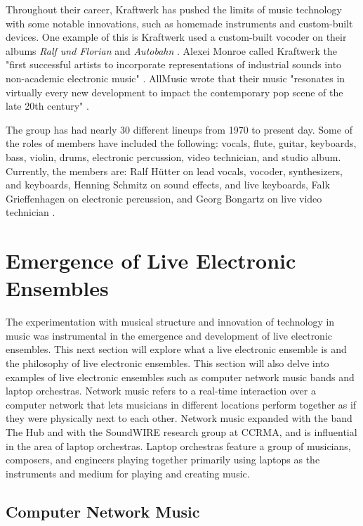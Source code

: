\documentclass[letterpaper, 12pt]{article}
\begin{document}
%
Throughout their career, Kraftwerk has pushed the limits of music technology with some notable innovations, such as homemade instruments and custom-built devices.
%
One example of this is Kraftwerk used a custom-built vocoder on their albums \textit{Ralf und Florian} and \textit{Autobahn} \citep{moogulator2006vocoder}.
%
Alexei Monroe called Kraftwerk the "first successful artists to incorporate representations of industrial sounds into non-academic electronic music" \citep{monroe2005interrogation}.
%
AllMusic wrote that their music "resonates in virtually every new development to impact the contemporary pop scene of the late 20th century" \citep{allmusic2009kraftwerk}.

%
The group has had nearly 30 different lineups from 1970 to present day. Some of the roles of members have included the following: vocals, flute, guitar, keyboards, bass, violin, drums, electronic percussion, video technician, and studio album.
%
Currently, the members are:
Ralf Hütter on lead vocals, vocoder, synthesizers, and keyboards,
Henning Schmitz on sound effects, and live keyboards,
Falk Grieffenhagen on electronic percussion, and
Georg Bongartz on live video technician \citep{monteiro2023c6}.

\section{Emergence of Live Electronic Ensembles}

The experimentation with musical structure and innovation of technology in music was instrumental in the emergence and development of live electronic ensembles.
%
This next section will explore what a live electronic ensemble is and the philosophy of live electronic ensembles. This section will also delve into examples of live electronic ensembles such as computer network music bands and laptop orchestras.
%
Network music refers to a real-time interaction over a computer network that lets musicians in different locations perform together as if they were physically next to each other.
%
Network music expanded with the band The Hub and with the SoundWIRE research group at CCRMA, and is influential in the area of laptop orchestras.
%
Laptop orchestras feature a group of musicians, composers, and engineers playing together primarily using laptops as the instruments and medium for playing and creating music.

\vspace*{24pt}

\subsection{Computer Network Music}
\end{document}
